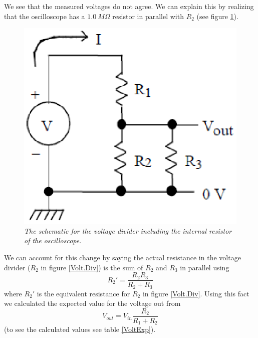 \documentclass[11pt]{article}
\numberwithin{equation}{section}
\begin{document}
We see that the measured voltages do not agree. We can explain this by realizing that the oscilloscope has a $1.0\ M\Omega$ resistor in parallel with $R_2$ (see figure \ref{Volt.Para}). 
\begin{figure}[h]
\begin{center}
\includegraphics[scale=0.75]{VoltdivPara.eps}
\caption{\textit{The schematic for the voltage divider including the internal resistor of the oscilloscope.}}
\label{Volt.Para}
\end{center}
\end{figure}
We can account for this change by saying the actual resistance in the voltage divider ($R_2$ in figure \ref{Volt.Div}) is the sum of $R_2$ and $R_3$ in parallel using 
\begin{equation}
R_2' = \frac{R_2R_3}{R_2+R_3}
\label{respara}
\end{equation}
where $R_2'$ is the equivalent resistance for $R_2$ in figure \ref{Volt.Div}. Using this fact we calculated the expected value for the voltage out from
\begin{equation}
V_{out} = V_{in}\frac{R_2}{R_1+R_2}
\label{VoltDivEQ}
\end{equation}
(to see the calculated values see table \ref{VoltExp}).
\end{document}
